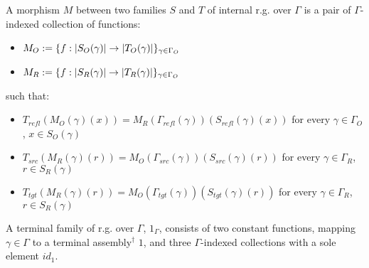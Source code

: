 \documentclass[12pt,a4paper]{article}
\def\cAsm{\mathcal{A}\mathit{sm}^\dagger}
\def\src{_{src}}\alwaysmath{src}
\def\rfl{_{refl}}\alwaysmath{rfl}
\def\tgt{_{tgt}}\alwaysmath{tgt}
\renewcommand{\O}{_{O}}\alwaysmath{O}
\def\R{_{R}}\alwaysmath{R}
\begin{document}
A morphism $M$ between two families $S$ and $T$ of internal r.g. over $\Gamma$ is a pair of $\Gamma$-indexed collection of functions:
\begin{itemize}[noitemsep]
  \item $M\O \define \{f : \carr{S\O(\gamma)} \to \carr{T\O(\gamma)} \}_{\gamma \in \Gamma\O}$
  \item $M\R \define \{f : \carr{S\R(\gamma)} \to \carr{T\R(\gamma)} \}_{\gamma \in \Gamma\O}$
\end{itemize}
such that:
\begin{itemize}[noitemsep]
  \item $T\rfl(M\O (\gamma)(x)) = M\R(\Gamma\rfl(\gamma))(S\rfl(\gamma)(x))$ for every $\gamma \in \Gamma\O$, $x \in S\O(\gamma)$
  \item $T\src(M\R (\gamma)(r)) = M\O(\Gamma\src(\gamma))(S\src(\gamma)(r))$ for every $\gamma \in \Gamma\R$, $r \in S\R(\gamma)$
  \item $T\tgt(M\R (\gamma)(r)) = M\O(\Gamma\tgt(\gamma))(S\tgt(\gamma)(r))$ for every $\gamma \in \Gamma\R$, $r \in S\R(\gamma)$
  
\end{itemize}

A terminal family of r.g. over $\Gamma$, $1_\Gamma$,  consists of two constant functions, mapping $\gamma\in\Gamma$ to a terminal assembly$^\dagger$ $1$, and three $\Gamma$-indexed collections with a sole element $id_1$.\\

\end{document}
